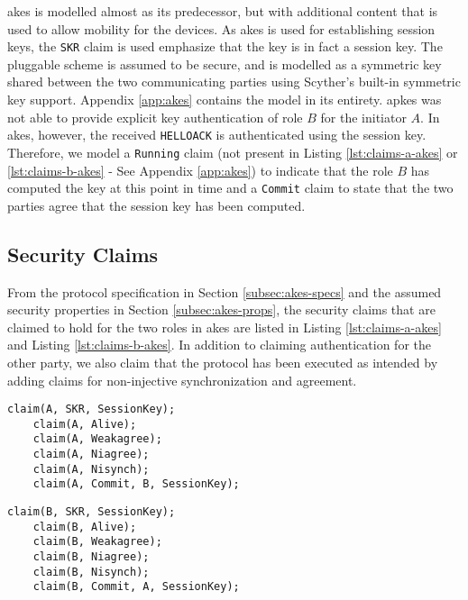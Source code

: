 \gls{akes} is modelled almost as its predecessor, but with additional content that is used to allow mobility for the devices. As \gls{akes} is used for establishing session keys, the \texttt{SKR} claim is used emphasize that the key is in fact a session key. The pluggable scheme is assumed to be secure, and is modelled as a symmetric key shared between the two communicating parties using Scyther's built-in symmetric key support. Appendix \ref{app:akes} contains the model in its entirety. \gls{apkes} was not able to provide explicit key authentication of role $B$ for the initiator $A$. In \gls{akes}, however, the received \texttt{HELLOACK} is authenticated using the session key. Therefore, we model a \texttt{Running} claim (not present in Listing \ref{lst:claims-a-akes} or \ref{lst:claims-b-akes} - See Appendix \ref{app:akes}) to indicate that the role $B$ has computed the key at this point in time and a \texttt{Commit} claim to state that the two parties agree that the session key has been computed.

\subsection{Security Claims}

From the protocol specification in Section \ref{subsec:akes-specs} and the assumed security properties in Section \ref{subsec:akes-props}, the security claims that are claimed to hold for the two roles in \gls{akes} are listed in Listing \ref{lst:claims-a-akes} and Listing \ref{lst:claims-b-akes}. In addition to claiming authentication for the other party, we also claim that the protocol has been executed as intended by adding claims for non-injective synchronization and agreement.\\

\begin{lstlisting}[caption={Security claims for role A in AKES.}, label={lst:claims-a-akes}]
	claim(A, SKR, SessionKey);
	claim(A, Alive);
	claim(A, Weakagree);
	claim(A, Niagree);
	claim(A, Nisynch);
	claim(A, Commit, B, SessionKey);
\end{lstlisting}


\begin{lstlisting}[caption={Security claims for role B in AKES.}, label={lst:claims-b-akes}]
	claim(B, SKR, SessionKey);
	claim(B, Alive);
	claim(B, Weakagree);
	claim(B, Niagree);
	claim(B, Nisynch);
	claim(B, Commit, A, SessionKey);
\end{lstlisting}

